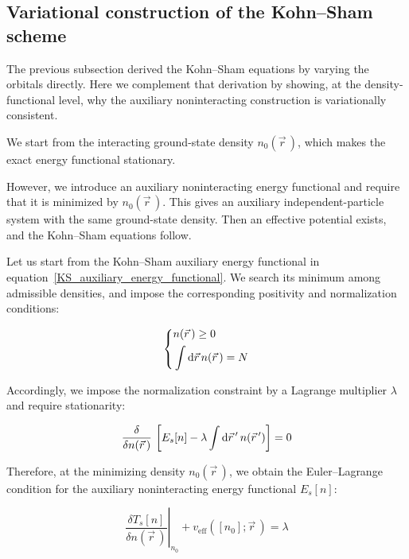 \subsection{Variational construction of the Kohn--Sham scheme}

The previous subsection derived the Kohn--Sham equations by varying the orbitals directly. Here we complement that derivation by showing, at the density-functional level, why the auxiliary noninteracting construction is variationally consistent.

We start from the interacting ground-state density $n_0(\vec{r}\,)$, which makes the exact energy functional stationary.

However, we introduce an auxiliary noninteracting energy functional and require that it is minimized by $n_0(\vec{r}\,)$.
This gives an auxiliary independent-particle system with the same ground-state density.
Then an effective potential exists, and the Kohn--Sham equations follow.

Let us start from the Kohn--Sham auxiliary energy functional in equation~\eqref{KS_auxiliary_energy_functional}.
We search its minimum among admissible densities,
and impose the corresponding positivity and normalization conditions:

\begin{equation}
\left\{
\begin{aligned}
    &n(\vec{r}\,) \ge 0 \\
    &\int\mathrm{d}{\vec{r}}\,n(\vec{r}\,) = N
\end{aligned}\right.
\label{admissible_density_conditions}
\end{equation}

Accordingly, we impose the normalization constraint by a Lagrange multiplier $\lambda$ and require stationarity:

\begin{equation}
    \frac{\delta}{\delta n(\vec{r}\,)}\,\left[
        E_s[n]-\lambda\int\mathrm{d}{\vec{r}\,'}\,n(\vec{r}\,')
    \right]=0
\label{KS_auxiliary_density_stationarity}
\end{equation}

Therefore, at the minimizing density $n_0(\vec{r}\,)$,
we obtain the Euler--Lagrange condition for the auxiliary noninteracting energy functional $E_s[n]$:

\begin{equation}
    \left.\frac{\delta T_s[n]}{\delta n(\vec{r}\,)}\right|_{n_0}+v_\mathrm{eff}([n_0];\vec{r}\,)=\lambda
\label{KS_auxiliary_EL_condition}
\end{equation}

